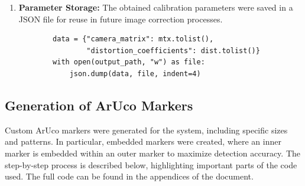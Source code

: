 \begin{enumerate}
        \item \textbf{Parameter Storage:} 
        The obtained calibration parameters were saved in a JSON file for reuse in future image correction processes.
        \begin{verbatim}
        data = {"camera_matrix": mtx.tolist(), 
                "distortion_coefficients": dist.tolist()}
        with open(output_path, "w") as file:
            json.dump(data, file, indent=4)
        \end{verbatim}
    \end{enumerate}


\subsection{Generation of ArUco Markers} 
Custom ArUco markers were generated for the system, including specific sizes and patterns. In particular, embedded markers were created, where an inner marker is embedded within an outer marker to maximize detection accuracy. The step-by-step process is described below, highlighting important parts of the code used. The full code can be found in the appendices of the document.

